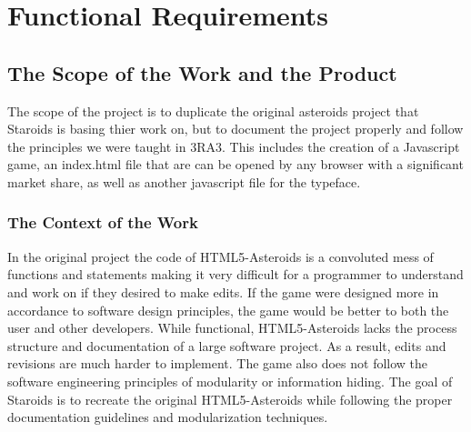 \documentclass[12pt, titlepage]{article}
\begin{document}
\section{Functional Requirements}

\subsection{The Scope of the Work and the Product}
The scope of the project is to duplicate the original asteroids project that Staroids is basing thier work on, but to document the project properly and follow the principles we were taught in 3RA3. This includes the creation of a Javascript game, an index.html file that are can be opened by any browser with a significant market share, as well as another javascript file for the typeface.\\

\subsubsection{The Context of the Work}
In the original project the code of HTML5-Asteroids is a convoluted mess of functions and statements making it very difficult for a programmer to understand and work on if they desired to make edits. If the game were designed more in accordance to software design principles, the game would be better to both the user and other developers. While functional, HTML5-Asteroids lacks the process structure and documentation of a large software project. As a result, edits and revisions are much harder to implement. The game also does not follow the software engineering principles of modularity or information hiding. The goal of Staroids is to recreate the original HTML5-Asteroids while following the proper documentation guidelines and modularization techniques.\\
\end{document}
